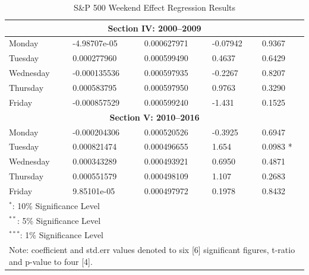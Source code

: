 \documentclass[11pt, english]{article}
\begin{document}
\begin{table}[h]
\begin{center}
\begin{tabular}{p{2cm}p{2cm}p{2cm}p{2cm}p{2cm}}
                \hline                                             
                \multicolumn{5}{c}{\textbf{Section IV: 2000--2009}}\\
                \hline            
                Monday & -4.98707e-05 & 0.000627971 & -0.07942 & 0.9367\\ 
                Tuesday & 0.000277960 & 0.000599490 & 0.4637 & 0.6429\\  
                Wednesday & -0.000135536 & 0.000597935 & -0.2267 & 0.8207\\
                Thursday & 0.000583795 & 0.000597950 & 0.9763 & 0.3290\\
                Friday & -0.000857529 & 0.000599240 & -1.431 & 0.1525\\            
                \hline                                             
                \multicolumn{5}{c}{\textbf{Section V: 2010--2016}}\\
                \hline
                Monday & -0.000204306 & 0.000520526 & -0.3925 & 0.6947\\ 
                Tuesday & 0.000821474 & 0.000496655 & 1.654 & 0.0983 *\\             
                Wednesday & 0.000343289 & 0.000493921 & 0.6950 & 0.4871\\
                Thursday & 0.000551579 & 0.000498109 & 1.107 & 0.2683\\
                Friday & 9.85101e-05 & 0.000497972 & 0.1978 & 0.8432 \\
                \hline
                \multicolumn{5}{l}{$^*$: 10\% Significance Level}\\
                \multicolumn{5}{l}{$^{**}$: 5\% Significance Level}\\
                \multicolumn{5}{l}{$^{***}$: 1\% Significance Level}\\
                \hline
		\multicolumn{5}{p{11.5cm}}{Note: coefficient and std.err values denoted to six [6] significant figures, t-ratio and p-value to four [4].}\\
                \hline
        \end{tabular}
		\caption{S\&P 500 Weekend Effect Regression Results}
        \end{center}
        \end{table}
\end{document}
